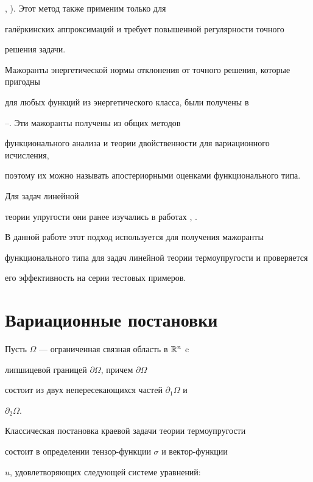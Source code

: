 \cite{Wa}, \cite{ZiZh1}). Этот метод также применим только для 


гал\"еркинских аппроксимаций и требует повышенной регулярности точного


решения задачи.





Мажоранты энергетической нормы отклонения от точного решения, которые пригодны 


для любых функций из энергетического класса, были получены в


\cite{Re1}--\cite{Re3}. Эти мажоранты получены из общих методов 


функционального анализа и теории двойственности для вариационного исчисления,


поэтому их можно называть апостериорными оценками функционального типа. 


Для задач линейной


теории упругости они ранее изучались в работах \cite{MuRe}, \cite{Re3}.





В данной работе этот подход используется для получения мажоранты 


функционального типа для задач линейной теории термоупругости и проверяется


его эффективность на серии тестовых примеров.








\section{Вариационные постановки}





Пусть $\Omega$ --- ограниченная связная область в ${\Bbb R}^n$ c


липшицевой границей $\partial \Omega$, причем $\partial \Omega$


состоит из двух непересекающихся частей $\partial_1 \Omega$ и


$\partial_2 \Omega$.


Классическая постановка краевой задачи теории термоупругости


состоит в определении тензор-функции $\sigma$ и вектор-функции


$u$, удовлетворяющих следующей системе уравнений:


